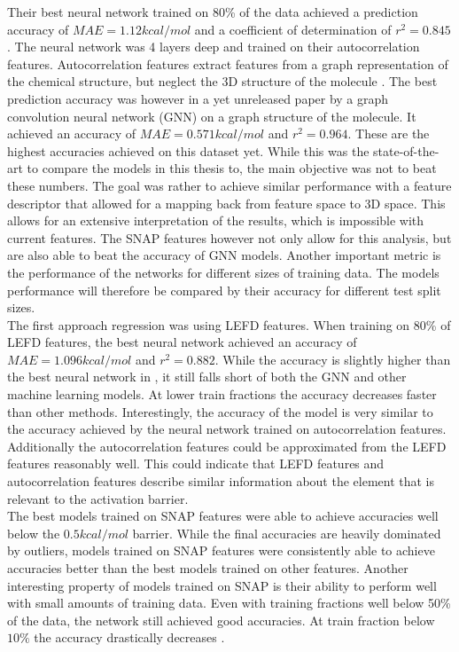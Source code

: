 Their best neural network trained on 80\% of the data achieved a prediction accuracy of $MAE = 1.12 kcal/mol$ and a 
coefficient of determination of $r^2 = 0.845$.
The neural network was 4 layers deep and trained on their autocorrelation features.
Autocorrelation features extract features from a graph representation of the chemical structure, but neglect the 
3D structure of the molecule \cite{friederich_dos}.
The best prediction accuracy was however in a yet unreleased paper by  a graph convolution neural network (GNN) on 
a graph structure of the molecule.
It achieved an accuracy of $MAE = 0.571 kcal/mol$ and $r^2=0.964$.
These are the highest accuracies achieved on this dataset yet.
While this was the state-of-the-art  to compare the models in this thesis to, the main objective was not to beat these numbers.
The goal was rather to achieve similar performance with a feature descriptor that allowed for a mapping back from feature space to 3D space.
This allows for an extensive interpretation of the results, which is impossible with current features.
The SNAP features however not only allow for this analysis, but are also able to beat the accuracy of GNN models.
Another important metric is the performance of the networks for different sizes of training data.
The models performance will therefore be compared by their accuracy for different test split sizes.
\\
The first approach regression was using LEFD features.
When training on 80\% of LEFD features, the best neural network achieved an accuracy of $MAE = 1.096 kcal/mol$ and $r^2=0.882$.
While the accuracy is slightly higher than the best neural network in \cite{friederich_dos}, it still falls short 
of both the GNN and other machine learning models.
At lower train fractions the accuracy decreases faster than other methods.
Interestingly, the accuracy of the model is very similar to the accuracy achieved by the neural network trained on autocorrelation 
features.
Additionally the autocorrelation features could be approximated from the LEFD features reasonably well.
This could indicate that LEFD features and autocorrelation features describe
similar information about the element that is relevant to the activation barrier. %
\\
The best models trained on SNAP features were able to achieve accuracies well below the $0.5 kcal/mol$ barrier.
While the final accuracies are heavily dominated by outliers, models trained on SNAP features were consistently
able to achieve accuracies better than the best models trained on other features.
Another interesting property of models trained on SNAP is their ability to perform well with small amounts 
of training data.
Even with training fractions well below 50\% of the data, the network still achieved good accuracies.
At train fraction below $10\%$ the accuracy drastically decreases .


